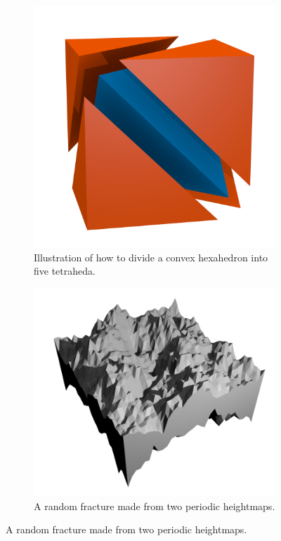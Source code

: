 \begin{figure}
    \centering
    \begin{subfigure}[b]{0.35\textwidth}
        \includegraphics[width=\textwidth]{images/fracture/hexahedron_to_tetrahedra.png}
        \caption{Illustration of how to divide a convex hexahedron into five tetraheda.}
        \label{fig:hex_to_tetra}
    \end{subfigure}
    \hspace{5mm}
    \begin{subfigure}[b]{0.55\textwidth}
        \includegraphics[width=\textwidth]{images/fracture/fracture02.png}
        \caption{A random fracture made from two periodic heightmaps.}
        \label{fig:fracture_model}
    \end{subfigure}
\end{figure}

